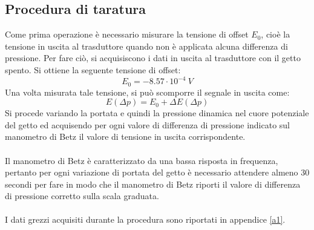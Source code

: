 \subsection{Procedura di taratura}
Come prima operazione è necessario misurare la tensione di offset $E_0$, cioè la tensione in uscita al trasduttore quando non è applicata alcuna differenza di pressione. Per fare ciò, si acquisiscono i dati in uscita al trasduttore con il getto spento. Si ottiene la seguente tensione di offset:
\begin{equation*}
    E_0 = -8.57\cdot 10^{-4}\ V
\end{equation*}
Una volta misurata tale tensione, si può scomporre il segnale in uscita come:
\begin{equation*}
    E(\Delta p) = E_0 + \Delta E(\Delta p)
\end{equation*}
Si procede variando la portata e quindi la pressione dinamica nel cuore potenziale del getto ed acquisendo per ogni valore di differenza di pressione indicato sul manometro di Betz il valore di tensione in uscita corrispondente.\\\\
Il manometro di Betz è caratterizzato da una bassa risposta in frequenza, pertanto per ogni variazione di portata del getto è necessario attendere almeno 30 secondi per fare in modo che il manometro di Betz riporti il valore di differenza di pressione corretto sulla scala graduata.\\\\
I dati grezzi acquisiti durante la procedura sono riportati in appendice \ref{a1}.\\\\

